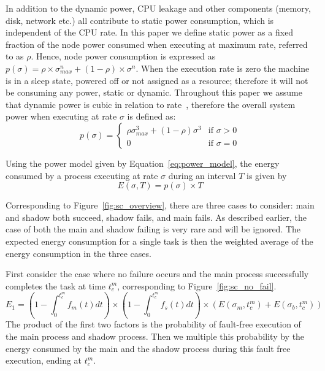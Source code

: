In addition to the dynamic power, CPU leakage and other components
(memory, disk, network etc.) all contribute to static power
consumption, which is independent of the CPU rate. In this paper we
define static power as a fixed fraction of the node power consumed
when executing at maximum rate, referred to as $\rho$. Hence, node power consumption is expressed as
$p(\sigma)=\rho \times \sigma_{max}^n + (1-\rho)\times \sigma^n$. When the execution rate is zero
the machine is in a sleep state, powered off or not assigned as a
resource; therefore it will not be consuming any power, static or
dynamic.  Throughout this paper we assume that dynamic power is cubic
in relation to
rate~\cite{rusu2003maximizing,zhai2004theoretical}, therefore the
overall system power when executing at rate $\sigma$ is defined as:
\begin{equation}
p(\sigma) = \begin{cases} \rho \sigma_{max}^3 + (1-\rho) \sigma^3 & \mbox{if } \sigma > 0 \\ 
                          0 & \mbox{if } \sigma = 0 \end{cases}
\label{eq:power_model}
\end{equation}

Using the power model given by Equation~\ref{eq:power_model}, the
energy consumed by a process executing at rate $\sigma$ during an
interval $T$ is given by
\begin{equation}
E(\sigma,T) = p(\sigma) \times T
\end{equation}


Corresponding to Figure~\ref{fig:sc_overview}, there are three cases to consider: main and shadow both succeed, shadow fails, 
and main fails. As described earlier, the case of both the main and
shadow failing is very rare and will be ignored. The expected
energy consumption for a single task is then the weighted average of
the energy consumption in the three cases.

First consider the case where no failure occurs and the main process
successfully completes the task at time $t_c^m$, corresponding to Figure~\ref{fig:sc_no_fail}.
\begin{equation}
E_1 =  ( 1-\int_0^{t_c^m}f_m(t)dt) \times (1 - \int_0^{t_c^m} f_s(t)dt) \times (  E(\sigma_m,t_c^m) + E(\sigma_b,t_c^m))
\label{eq:energy_no_failure}
\end{equation}
The product of the first two factors is the probability of fault-free execution of the main
process and shadow process. Then we multiple this probability by the
energy consumed by the main and the shadow process during this fault
free execution, ending at $t_c^m$.


